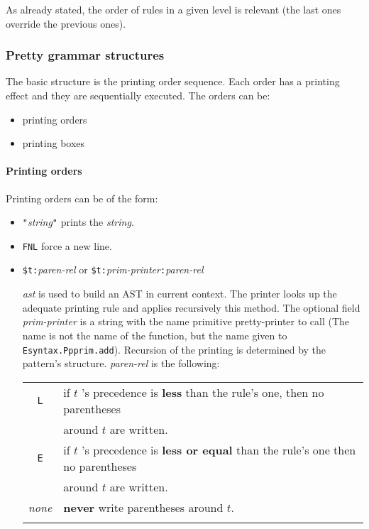 {As already stated, the order of rules in a given level is relevant
(the last ones override the previous ones).

 
\subsubsection{Pretty grammar structures}
The basic structure is the printing order sequence. Each order has a
printing effect and they are sequentially executed. The orders can
be:
\begin{itemize}
\item printing orders
\item printing boxes
\end{itemize}

\paragraph{Printing orders}
Printing orders can be of the form:
\begin{itemize}
\item \verb+"+{\sl string}\verb+"+ prints the {\sl string}.
\item \verb+FNL+ force a new line.

\item \texttt{\$t:}\textsl{paren-rel} or
  \texttt{\$t:}\textsl{prim-printer}\texttt{:}\textsl{paren-rel}

  {\sl ast} is used to build an AST in current context. The printer
  looks up the adequate printing rule and applies recursively this
  method.  The optional field {\it prim-printer} is a string with the
  name primitive pretty-printer to call (The name is not the name of
  the {\ocaml} function, but the name given to {\tt
  Esyntax.Ppprim.add}).  Recursion of the printing is determined by
  the pattern's structure.  {\it paren-rel} is the following:

\begin{tabular}{cl}

\verb+L+ &
    if $t$ 's precedence is {\bf less} than the rule's one, then no
    parentheses \\
  & around $t$ are written. \\
\verb+E+  &
    if $t$ 's precedence is {\bf less or equal} than  the rule's one
    then no parentheses \\
 &  around $t$ are written. \\
{\it none} & {\bf never} write parentheses around $t$.
\\\\
\end{tabular}
\end{itemize}

}
